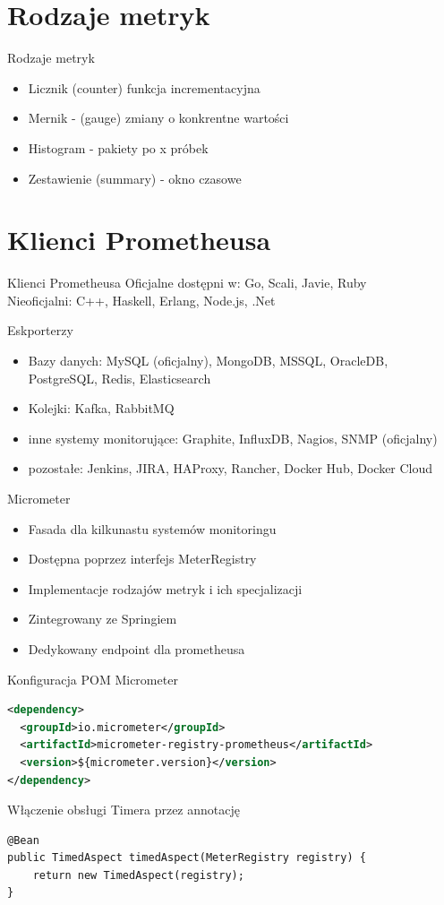 \documentclass[epic,eepic,aspectratio=169,12pt]{beamer}
\begin{document}
\section{Rodzaje metryk}
\begin{frame}{Rodzaje metryk}
	\begin{itemize}
		\item Licznik (counter) funkcja incrementacyjna
		\item Mernik - (gauge) zmiany o konkrentne wartości
		\item Histogram - pakiety po x próbek
		\item Zestawienie (summary) - okno czasowe
	\end{itemize}
\end{frame}
\section{Klienci Prometheusa}
\begin{frame}{Klienci Prometheusa}
	Oficjalne dostępni w: Go, Scali, Javie, Ruby\\
	Nieoficjalni: C++, Haskell, Erlang, Node.js, .Net		
\end{frame}
\begin{frame}{Eskporterzy}
	\begin{itemize}
		\item Bazy danych: MySQL (oficjalny), MongoDB, MSSQL, OracleDB, PostgreSQL, Redis, Elasticsearch
		\item Kolejki: Kafka, RabbitMQ 
		\item inne systemy monitorujące: Graphite, InfluxDB, Nagios, SNMP (oficjalny)
		\item pozostałe: Jenkins, JIRA,  HAProxy, Rancher, Docker Hub, Docker Cloud 
	\end{itemize}
\end{frame}
\begin{frame}{Micrometer}	
	\begin{itemize}
		\item Fasada dla kilkunastu systemów monitoringu
		\item Dostępna poprzez interfejs MeterRegistry
		\item Implementacje rodzajów metryk i ich specjalizacji
		\item Zintegrowany ze Springiem
		\item Dedykowany endpoint dla prometheusa
	\end{itemize}
\end{frame}
\begin{frame}[fragile]{Konfiguracja POM Micrometer}
	\begin{lstlisting}[language=XML]
<dependency>
  <groupId>io.micrometer</groupId>
  <artifactId>micrometer-registry-prometheus</artifactId>
  <version>${micrometer.version}</version>
</dependency>
	\end{lstlisting}
\end{frame}
\begin{frame}[fragile]{Włączenie obsługi Timera przez annotację}
		\begin{lstlisting}
@Bean
public TimedAspect timedAspect(MeterRegistry registry) {
	return new TimedAspect(registry);
}
		\end{lstlisting}
\end{frame}
\end{document}
